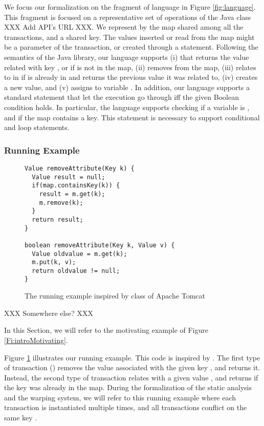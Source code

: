 We focus our formalization on the fragment of language in Figure \ref{fig:language}. This fragment is focused on a representative set  of operations of the Java  class XXX Add API's URL XXX. We represent by  the map shared among all the transactions, and  a shared key. The values inserted or read from the map might be a parameter of the transaction, or created through a  statement. Following the semantics of the Java library, our language supports (i)  that returns the value  related with key , or  if  is not in the map, (ii)  removes  from the map, (iii)  relates  to  in  if  is already in  and returns the previous value it was related to, (iv)  creates a new value, and (v)  assigns  to variable . In addition, our language supports a standard  statement that let the execution go through iff the given Boolean condition holds. In particular, the language supports checking if a variable is , and if the map contains a key. This statement is necessary to support conditional and loop statements.


\subsubsection{Running Example}

\begin{figure}
\begin{lstlisting}
Value removeAttribute(Key k) {
  Value result = null;
  if(map.containsKey(k)) {
    result = m.get(k);
    m.remove(k);
  }
  return result;
}
	
boolean removeAttribute(Key k, Value v) {
  Value oldvalue = m.get(k);
  m.put(k, v);
  return oldvalue != null;
}
\end{lstlisting}
\caption{The running example inspired by class  of Apache Tomcat}
\label{lst:runningexamplestaticanalysis}
\end{figure}

XXX Somewhere else? XXX

In this Section, we will refer to the motivating example of Figure \ref{Fi:introMotivating}. 

Figure \ref{lst:runningexamplestaticanalysis} illustrates our running example. This code is inspired by . The first type of transaction () removes the value associated with the given key , and returns it. Instead, the second type of transaction relates  with a given value , and returns  if the key was already in the map. During the formalization of the static analysis and the warping system, we will refer to this running example where each transaction is instantiated multiple times, and all transactions conflict on the same key .


